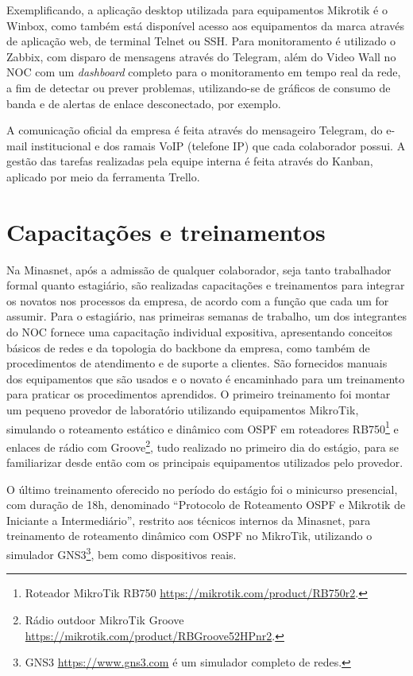     Exemplificando, a aplicação desktop utilizada para equipamentos Mikrotik é o Winbox, como também está disponível acesso aos equipamentos da marca através de aplicação web, de terminal Telnet ou SSH. Para monitoramento é utilizado o Zabbix, com disparo de mensagens através do Telegram, além do Video Wall no NOC com um \textit{dashboard} completo para o monitoramento em tempo real da rede, a fim de detectar ou prever problemas, utilizando-se de gráficos de consumo de banda e de alertas de enlace desconectado, por exemplo.

    A comunicação oficial da empresa é feita através do mensageiro Telegram, do e-mail institucional e dos ramais VoIP (telefone IP) que cada colaborador possui. A gestão das tarefas realizadas pela equipe interna é feita através do Kanban, aplicado por meio da ferramenta Trello.

\section{Capacitações e treinamentos}

    Na Minasnet, após a admissão de qualquer colaborador, seja tanto trabalhador formal quanto estagiário, são realizadas capacitações e treinamentos para integrar os novatos nos processos da empresa, de acordo com a função que cada um for assumir. Para o estagiário, nas primeiras semanas de trabalho, um dos integrantes do NOC fornece uma capacitação individual expositiva, apresentando conceitos básicos de redes e da topologia do backbone da empresa, como também de procedimentos de atendimento e de suporte a clientes. São fornecidos manuais dos equipamentos que são usados e o novato é encaminhado para um treinamento para praticar os procedimentos aprendidos. O primeiro treinamento foi montar um pequeno provedor de laboratório utilizando equipamentos MikroTik, simulando o roteamento estático e dinâmico com OSPF em roteadores RB750\footnote{Roteador MikroTik RB750 \url{https://mikrotik.com/product/RB750r2}.} e enlaces de rádio com Groove\footnote{Rádio outdoor MikroTik Groove \url{https://mikrotik.com/product/RBGroove52HPnr2}.}, tudo realizado no primeiro dia do estágio, para se familiarizar desde então com os principais equipamentos utilizados pelo provedor. 
    
    O último treinamento oferecido no período do estágio foi o minicurso presencial, com duração de 18h, denominado ``Protocolo de Roteamento OSPF e Mikrotik de Iniciante a Intermediário'', restrito aos técnicos internos da Minasnet, para treinamento de roteamento dinâmico com OSPF no MikroTik, utilizando o simulador GNS3\footnote{GNS3 \url{https://www.gns3.com} é um simulador completo de redes.}, bem como dispositivos reais.

